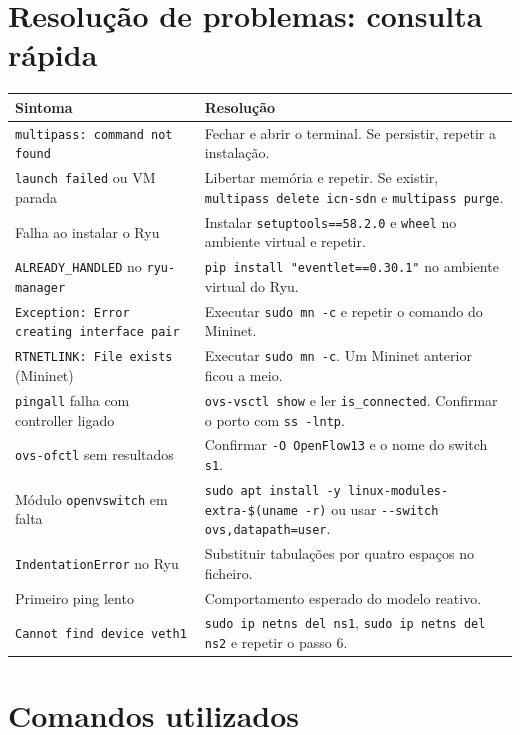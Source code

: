 \documentclass[11pt,a4paper]{article}
\newcommand{\cmd}[1]{\texttt{#1}}
\begin{document}
\clearpage
\section*{Resolução de problemas: consulta rápida}

\renewcommand{\arraystretch}{1.7}
\begin{center}
\small
\begin{tabular}{>{\raggedright\arraybackslash}p{5.6cm} >{\raggedright\arraybackslash}p{9.2cm}}
\toprule
\textbf{Sintoma} & \textbf{Resolução} \\
\midrule
\cmd{multipass: command not found} & Fechar e abrir o terminal. Se persistir, repetir a instalação. \\
\cmd{launch failed} ou VM parada & Libertar memória e repetir. Se existir, \cmd{multipass delete icn-sdn} e \cmd{multipass purge}. \\
Falha ao instalar o Ryu & Instalar \cmd{setuptools==58.2.0} e \cmd{wheel} no ambiente virtual e repetir. \\
\cmd{ALREADY\_HANDLED} no \cmd{ryu-manager} & \cmd{pip install "eventlet==0.30.1"} no ambiente virtual do Ryu. \\
\cmd{Exception: Error creating interface pair} & Executar \cmd{sudo mn -c} e repetir o comando do Mininet. \\
\cmd{RTNETLINK: File exists} (Mininet) & Executar \cmd{sudo mn -c}. Um Mininet anterior ficou a meio. \\
\cmd{pingall} falha com controller ligado & \cmd{ovs-vsctl show} e ler \cmd{is\_connected}. Confirmar o porto com \cmd{ss -lntp}. \\
\cmd{ovs-ofctl} sem resultados & Confirmar \cmd{-O OpenFlow13} e o nome do switch \cmd{s1}. \\
Módulo \cmd{openvswitch} em falta & \cmd{sudo apt install -y linux-modules-extra-\$(uname -r)} ou usar \cmd{-{}-switch ovs,datapath=user}. \\
\cmd{IndentationError} no Ryu & Substituir tabulações por quatro espaços no ficheiro. \\
Primeiro ping lento & Comportamento esperado do modelo reativo. \\
\cmd{Cannot find device veth1} & \cmd{sudo ip netns del ns1}, \cmd{sudo ip netns del ns2} e repetir o passo 6. \\
\bottomrule
\end{tabular}
\end{center}

\section*{Comandos utilizados}
\end{document}
